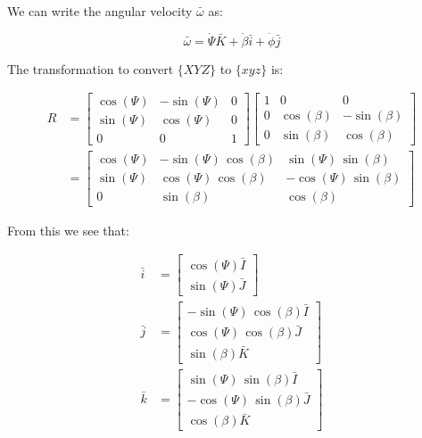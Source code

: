 \documentclass[12pt, letterpaper]{../assignment}
\begin{document}
We can write the angular velocity $\bar{\omega}$ as:

$$ \bar{\omega} = \dot{\Psi} \bar{K} + \dot{\beta} \bar{i} + \dot{\phi} \bar{j} $$

The transformation to convert $\{XYZ\}$ to $\{xyz\}$ is:

\begin{equation*}
    \begin{aligned}
R &= \left[\begin{array}{ccc} \cos\left(\Psi \right) & -\sin\left(\Psi \right) & 0\\ \sin\left(\Psi \right) & \cos\left(\Psi \right) & 0\\ 0 & 0 & 1 \end{array}\right]
\left[\begin{array}{ccc} 1 & 0 & 0\\ 0 & \cos\left(\beta \right) & -\sin\left(\beta \right)\\ 0 & \sin\left(\beta \right) & \cos\left(\beta \right) \end{array}\right]\\
&= \left[\begin{array}{ccc} \cos\left(\Psi \right) & -\sin\left(\Psi \right)\,\cos\left(\beta \right) & \sin\left(\Psi \right)\,\sin\left(\beta \right)\\ \sin\left(\Psi \right) & \cos\left(\Psi \right)\,\cos\left(\beta \right) & -\cos\left(\Psi \right)\,\sin\left(\beta \right)\\ 0 & \sin\left(\beta \right) & \cos\left(\beta \right) \end{array}\right]
\end{aligned}
\end{equation*}

From this we see that:

\begin{equation*}
\begin{aligned}
    \bar{i} &= \left[\begin{array}{r} \cos\left(\Psi \right) \bar{I}\\ \sin\left(\Psi \right) \bar{J} \end{array}\right]\\
    \bar{j} &= \left[\begin{array}{r} -\sin\left(\Psi \right)\,\cos\left(\beta \right) \bar{I} \\ \cos\left(\Psi \right)\,\cos\left(\beta \right) \bar{J}\\ \sin\left(\beta \right) \bar{K} \end{array} \right] \\
    \bar{k} &= \left[\begin{array}{r} \sin\left(\Psi \right)\,\sin\left(\beta \right) \bar{I}\\ -\cos\left(\Psi \right)\,\sin\left(\beta \right) \bar{J}\\ \cos\left(\beta \right) \bar{K} \end{array} \right] \\
\end{aligned}
\end{equation*}
\end{document}
